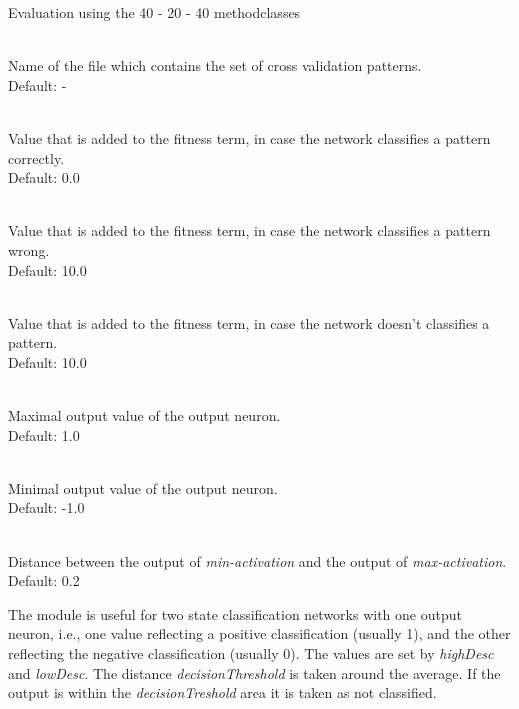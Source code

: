 \begin{moduledoc}{Evaluation using the 40 - 20 - 40 method}{classes}


\item[\KeyWord{crossPattern} \optParam{name}]~\\
Name of the file which contains the set of cross validation patterns.\\
Default: -


\item[\KeyWord{hitRating} \optParam{f}]~\\
Value that is added to the fitness term, in case the network classifies a
pattern correctly.\\
Default: 0.0

\item[\KeyWord{missRating} \optParam{f}]~\\  
Value that is added to the fitness term, in case the network classifies a
pattern wrong.\\
Default: 10.0

\item[\KeyWord{noneRating} \optParam{f}]~\\ 
Value that is added to the fitness term, in case the network doesn't classifies a
pattern.\\
Default: 10.0

\item[\KeyWord{highDesc} \optParam{f}]~\\ 
Maximal output value of the output neuron.\\
Default: 1.0

\item[\KeyWord{lowDesc} \optParam{f}]~\\ 
Minimal output value of the output neuron.\\
Default: -1.0

\item[\KeyWord{decisionThreshold} \optParam{f}]~\\ 
Distance between the output of  {\it min-activation} and
the output of {\it max-activation}.\\
Default: 0.2

\end{moduledoc}

The module is useful for two state classification networks with one output neuron, i.e.,
one value reflecting a positive classification (usually 1),
and the other reflecting the negative classification (usually 0).
The values are set by {\it highDesc} and {\it lowDesc}. The distance
{\it decisionThreshold} is taken around the average. If the output is within
the {\it decisionTreshold} area it is taken as not classified.

